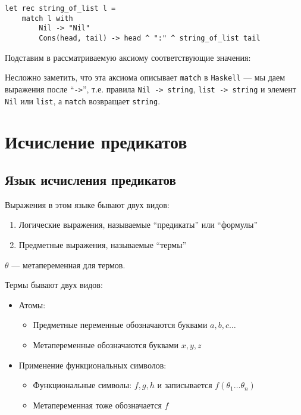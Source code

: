 \begin{verbatim}
let rec string_of_list l =
    match l with
        Nil -> "Nil"
        Cons(head, tail) -> head ^ ":" ^ string_of_list tail
\end{verbatim}

Подставим в рассматриваемую аксиому соответствующие значения:
\begin{center}
    \begin{prooftree}
    \end{prooftree}
\end{center}

Несложно заметить, что эта аксиома описывает \texttt{match} в \texttt{Haskell} --- мы даем выражения после ``\texttt{->}'', т.е. правила \texttt{Nil -> string}, \texttt{list -> string} и элемент \texttt{Nil} или \texttt{list}, а \texttt{match} возвращает \texttt{string}.

\section{Исчисление предикатов}

\subsection{Язык исчисления предикатов}

Выражения в этом языке бывают двух видов:
\begin{enumerate}
    \item Логические выражения, называемые ``предикаты'' или ``формулы''
    \item Предметные выражения, называемые ``термы''
\end{enumerate}

\(\theta\) --- метапеременная для термов.

Термы бывают двух видов:
\begin{itemize}
    \item Атомы:
          \begin{itemize}
              \item Предметные переменные обозначаются буквами \(a,b,c \dots \)
              \item Метапеременные обозначаются буквами \(x,y,z\)
          \end{itemize}
    \item Применение функциональных символов:
          \begin{itemize}
              \item Функциональные символы: \(f,g,h\) и записывается \(f(\theta_1 \dots \theta_n)\)
              \item Метапеременная тоже обозначается \(f\)
          \end{itemize}
\end{itemize}

